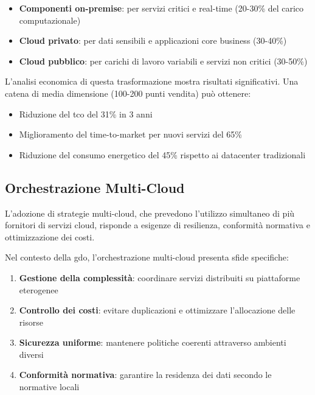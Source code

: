 \begin{itemize}
    \item \textbf{Componenti on-premise}: per servizi critici e real-time (20-30\% del carico computazionale)
    \item \textbf{Cloud privato}: per dati sensibili e applicazioni core business (30-40\%)
    \item \textbf{Cloud pubblico}: per carichi di lavoro variabili e servizi non critici (30-50\%)
\end{itemize}

L'analisi economica di questa trasformazione mostra risultati significativi. Una catena di media dimensione (100-200 punti vendita) può ottenere\autocite{Deloitte2024}:
\begin{itemize}
    \item Riduzione del \gls{tco} del 31\% in 3 anni
    \item Miglioramento del time-to-market per nuovi servizi del 65\%
    \item Riduzione del consumo energetico del 45\% rispetto ai datacenter tradizionali
\end{itemize}

\subsection{\texorpdfstring{Orchestrazione Multi-Cloud}{3.5.2 - Orchestrazione Multi-Cloud}}
\label{subsec:multicloud}

L'adozione di strategie multi-cloud, che prevedono l'utilizzo simultaneo di più fornitori di servizi cloud, risponde a esigenze di resilienza, conformità normativa e ottimizzazione dei costi\autocite{Flexera2024}. 

Nel contesto della \gls{gdo}, l'orchestrazione multi-cloud presenta sfide specifiche:

\begin{enumerate}
    \item \textbf{Gestione della complessità}: coordinare servizi distribuiti su piattaforme eterogenee
    \item \textbf{Controllo dei costi}: evitare duplicazioni e ottimizzare l'allocazione delle risorse
    \item \textbf{Sicurezza uniforme}: mantenere politiche coerenti attraverso ambienti diversi
    \item \textbf{Conformità normativa}: garantire la residenza dei dati secondo le normative locali
\end{enumerate}

